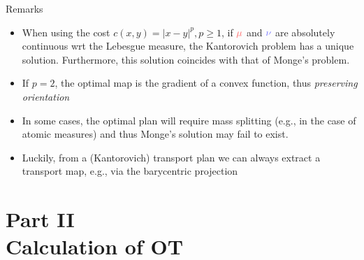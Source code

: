 \documentclass[pdf,aspectratio=169,10pt]{beamer}
\begin{document}
\begin{frame}{Remarks} 
    \begin{itemize}
        \item When using the cost $c(x,y) = |x-y|^p, p\geq 1$, if $\er{\mu}$ and $\eb{\nu}$ are absolutely continuous wrt the Lebesgue measure, the Kantorovich problem has a unique solution. Furthermore, this solution coincides with that of Monge's problem.
        \item If $p=2$, the optimal map is the gradient of a convex function, thus \emph{preserving orientation}
        \item In some cases, the optimal plan will require mass splitting (e.g., in the case of atomic measures) and thus Monge's solution may fail to exist. 
        \item Luckily, from a (Kantorovich) transport plan we can always extract a transport map, e.g., via the barycentric projection
    \end{itemize}
\end{frame}





\begin{frame}[plain]
\vspace{2em}
    \Large {}
\end{frame}




\section{Part II \\ Calculation of OT}

\begin{frame}
\vspace{2em}
    \Large {}
\end{frame}
\end{document}
